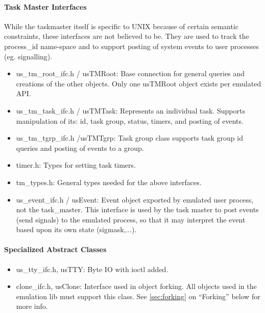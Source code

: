 \paragraph{Task Master Interfaces}
While the taskmaster itself is specific to UNIX because of certain
semantic constraints, these interfaces are not believed to be.  They are
used to track the process\_id name-space and to support posting
of system events to user processes (eg. signalling).
\begin{itemize}
\item{us\_tm\_root\_ifc.h / usTMRoot}: Base connection for general queries and
creations of the other objects.  Only one usTMRoot object exists per emulated
API.
\item{us\_tm\_task\_ifc.h / usTMTask}: Represents an individual task.  Supports
manipulation of its: id, task group, status, timers, and posting of events.
\item{us\_tm\_tgrp\_ifc.h /usTMTgrp}: Task group class supports task group id
queries and posting of events to a group.
\item{timer.h}: Types for setting task timers.
\item{tm\_types.h}: General types needed for the above interfaces.
\item{us\_event\_ifc.h / usEvent}: Event object exported by emulated
user process, not the task\_master.  This interface is used by the task
master to post events (send signals) to the emulated process, so that
it may interpret the event based upon its own state (sigmask,...).
\end{itemize}

\paragraph{Specialized Abstract Classes}
\begin{itemize}
\item{us\_tty\_ifc.h, usTTY}: Byte IO with ioctl added.
\item{clone\_ifc.h, usClone}: Interface used in object forking.  
All objects used in the emulation lib must support this class. See
{\SECREF} \ref{sec:forking} on ``Forking'' below for more info.
\end{itemize}

